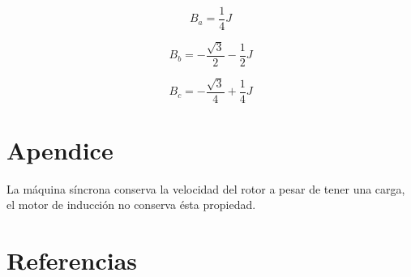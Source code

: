 \documentclass[]{article}
\begin{document}
\begin{equation}
B_a=\frac{1}{4}J
\end{equation}


\begin{equation}
   B_b=-\frac{\sqrt{3}}{2}-\frac{1}{2}J
\end{equation}

\begin{equation}
B_c=-\frac{\sqrt{3}}{4}+\frac{1}{4}J
\end{equation}


\section{Apendice}

La máquina síncrona conserva la velocidad del rotor a pesar de tener una carga, el motor de inducción no conserva ésta propiedad.\\

\section{Referencias}

%
%



\begin{thebibliography}{9}
	
	
	
	
	
\end{thebibliography}
\end{document}
